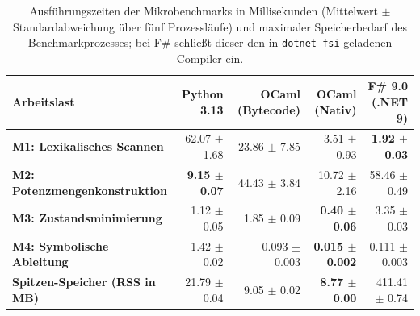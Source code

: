 \begin{table}[htbp]
  \centering
  \footnotesize
  \setlength{\tabcolsep}{4pt}
  \caption{Ausführungszeiten der Mikrobenchmarks in Millisekunden (Mittelwert $\pm$ Standardabweichung über fünf Prozessläufe) und maximaler Speicherbedarf des Benchmarkprozesses; bei F\# schließt dieser den in \texttt{dotnet fsi} geladenen Compiler ein.}
  \label{tab:microbenchmarks}
  \begin{tabularx}{\textwidth}{lrrrr}
    \toprule
    \textbf{Arbeitslast} & \textbf{Python 3.13} & \textbf{OCaml (Bytecode)} & \textbf{OCaml (Nativ)} & \textbf{F\# 9.0 (.NET 9)} \\
    \midrule
    \textbf{M1: Lexikalisches Scannen} & 62.07 $\pm$ 1.68 & 23.86 $\pm$ 7.85 & 3.51 $\pm$ 0.93 & \textbf{1.92 $\pm$ 0.03} \\
    \addlinespace[3pt]
    \textbf{M2: Potenzmengenkonstruktion} & \textbf{9.15 $\pm$ 0.07} & 44.43 $\pm$ 3.84 & 10.72 $\pm$ 2.16 & 58.46 $\pm$ 0.49 \\
    \addlinespace[3pt]
    \textbf{M3: Zustandsminimierung} & 1.12 $\pm$ 0.05 & 1.85 $\pm$ 0.09 & \textbf{0.40 $\pm$ 0.06} & 3.35 $\pm$ 0.03 \\
    \addlinespace[3pt]
    \textbf{M4: Symbolische Ableitung} & 1.42 $\pm$ 0.02 & 0.093 $\pm$ 0.003 & \textbf{0.015 $\pm$ 0.002} & 0.111 $\pm$ 0.003 \\
    \midrule
    \textbf{Spitzen-Speicher (RSS in MB)} & 21.79 $\pm$ 0.04 & 9.05 $\pm$ 0.02 & \textbf{8.77 $\pm$ 0.00} & 411.41 $\pm$ 0.74 \\
    \bottomrule
  \end{tabularx}
\end{table}

